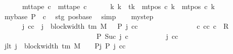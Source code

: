 \begin{isabellebody}
\ \ \ \ \ {\isasymand}\ mt{\isacharunderscore}{\kern0pt}tape\ c\ {\isacharequal}{\kern0pt}\ mt{\isacharunderscore}{\kern0pt}tape\ c{\isacharprime}{\kern0pt}\isanewline
\ \ \ \ \ {\isasymand}\ {\isacharparenleft}{\kern0pt}{\isasymforall}k{\isacharprime}{\kern0pt}{\isachardot}{\kern0pt}\ k{\isacharprime}{\kern0pt}\ {\isasymnoteq}\ tk\ {\isasymlongrightarrow}\ mt{\isacharunderscore}{\kern0pt}pos\ c\ k{\isacharprime}{\kern0pt}\ {\isacharequal}{\kern0pt}\ mt{\isacharunderscore}{\kern0pt}pos\ c{\isacharprime}{\kern0pt}\ k{\isacharprime}{\kern0pt}{\isacharparenright}{\kern0pt}{\isachardoublequoteclose}\isanewline
\ \ \isamarkupfalse%
\ mybase{\isacharcolon}{\kern0pt}\ {\isachardoublequoteopen}{\isacharquery}{\kern0pt}P\ {}\ c{\isacharprime}{\kern0pt}{\isachardoublequoteclose}\ \isamarkupfalse%
\ stg\ pos{\isacharunderscore}{\kern0pt}base\ \isamarkupfalse%
\ simp\isanewline
\ \ \isamarkupfalse%
\ mystep{\isacharcolon}{\kern0pt}\isanewline
\ \ \ \ \ \ {\isachardoublequoteopen}{\isasymAnd}j\ cc{\isachardot}{\kern0pt}\ {\isasymlbrakk}\ j\ {\isacharless}{\kern0pt}\ block{\isacharunderscore}{\kern0pt}width\ {\isacharparenleft}{\kern0pt}{\isasymGamma}{\isacharunderscore}{\kern0pt}tm\ M{\isacharparenright}{\kern0pt}\ {\isacharminus}{\kern0pt}\ {}{\isacharsemicolon}{\kern0pt}\ {\isacharquery}{\kern0pt}P\ j\ cc\ {\isasymrbrakk}\isanewline
\ \ \ \ \ \ \ \ \ \ \ \ \ \ {\isasymLongrightarrow}\ {\isasymexists}c{\isacharprime}{\kern0pt}{\isacharprime}{\kern0pt}{\isachardot}{\kern0pt}\ {\isacharparenleft}{\kern0pt}cc{\isacharcomma}{\kern0pt}\ c{\isacharprime}{\kern0pt}{\isacharprime}{\kern0pt}{\isacharparenright}{\kern0pt}\ {\isasymin}\ R{\isacharprime}{\kern0pt}\isanewline
\ \ \ \ \ \ \ \ \ \ \ \ \ \ \ \ \ \ \ \ \ \ \ \ \ \ {\isasymand}\ {\isacharquery}{\kern0pt}P\ {\isacharparenleft}{\kern0pt}Suc\ j{\isacharparenright}{\kern0pt}\ c{\isacharprime}{\kern0pt}{\isacharprime}{\kern0pt}{\isachardoublequoteclose}\isanewline
\ \ \isamarkupfalse%
\ {\isacharminus}{\kern0pt}\isanewline
\ \ \ \ \isamarkupfalse%
\ j\ cc\isanewline
\ \ \ \ \isamarkupfalse%
\ jlt{\isacharcolon}{\kern0pt}\ {\isachardoublequoteopen}j\ {\isacharless}{\kern0pt}\ block{\isacharunderscore}{\kern0pt}width\ {\isacharparenleft}{\kern0pt}{\isasymGamma}{\isacharunderscore}{\kern0pt}tm\ M{\isacharparenright}{\kern0pt}\ {\isacharminus}{\kern0pt}\ {}{\isachardoublequoteclose}\ \ Pj{\isacharcolon}{\kern0pt}\ {\isachardoublequoteopen}{\isacharquery}{\kern0pt}P\ j\ cc{\isachardoublequoteclose}\isanewline

\end{isabellebody}
